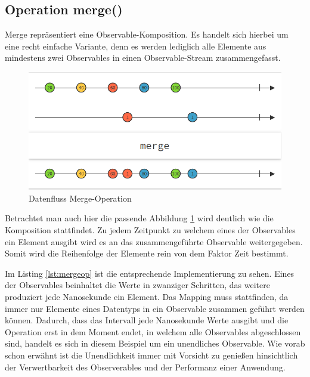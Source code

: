 \subsection{Operation merge()}
Merge repräsentiert eine Observable-Komposition. Es handelt sich hierbei um eine recht einfache Variante, denn es werden lediglich alle Elemente aus mindestens zwei Observables in einen Observable-Stream zusammengefasst. 
\begin{figure}
	\centering
	\includegraphics[width=1\textwidth]{Abb/merge}
	\caption{Datenfluss Merge-Operation}
	\label{pic:merge}
\end{figure}
Betrachtet man auch hier die passende Abbildung \ref{pic:merge} wird deutlich wie die Komposition stattfindet. Zu jedem Zeitpunkt zu welchem eines der Observables ein Element ausgibt wird es an das zusammengeführte Observable weitergegeben. Somit wird die Reihenfolge der Elemente rein von dem Faktor Zeit bestimmt.
 
Im Listing \ref{lst:mergeop} ist die entsprechende Implementierung zu sehen. Eines der Observables beinhaltet die Werte in zwanziger Schritten, das weitere produziert jede Nanosekunde ein Element. Das Mapping muss stattfinden, da immer nur Elemente eines Datentyps in ein Observable zusammen geführt werden können. Dadurch, dass das Intervall jede Nanosekunde Werte ausgibt und die Operation erst in dem Moment endet, in welchem alle Observables abgeschlossen sind, handelt es sich in diesem Beispiel um ein unendliches Observable. Wie vorab schon erwähnt ist die Unendlichkeit immer mit Vorsicht zu genießen hinsichtlich der Verwertbarkeit des Observerables und der Performanz einer Anwendung.
